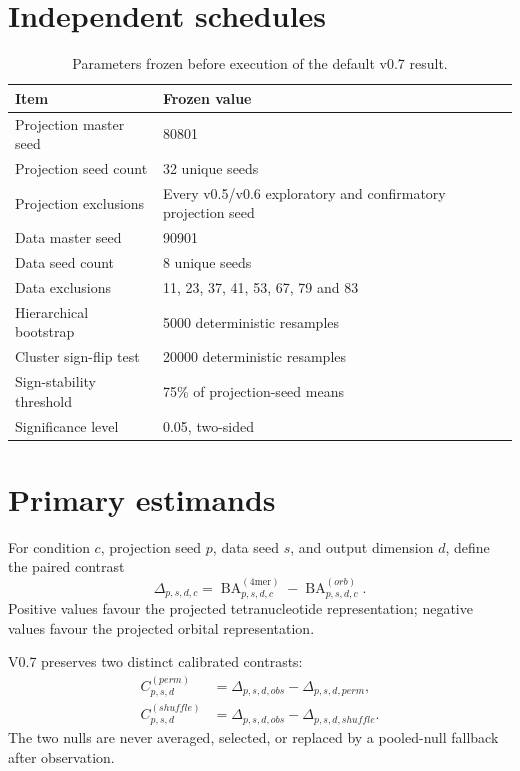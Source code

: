 \documentclass[11pt]{article}
\begin{document}
\section{Independent schedules}
\begin{table}[htbp]
\centering
\begin{tabular}{>{\raggedright\arraybackslash}p{}p{}}
\toprule
Item & Frozen value \\
\midrule
Projection master seed & 80801 \\
Projection seed count & 32 unique seeds \\
Projection exclusions & Every v0.5/v0.6 exploratory and confirmatory projection seed \\
Data master seed & 90901 \\
Data seed count & 8 unique seeds \\
Data exclusions & 11, 23, 37, 41, 53, 67, 79 and 83 \\
Hierarchical bootstrap & 5000 deterministic resamples \\
Cluster sign-flip test & 20000 deterministic resamples \\
Sign-stability threshold & 75\% of projection-seed means \\
Significance level & 0.05, two-sided \\
\bottomrule
\end{tabular}
\caption{Parameters frozen before execution of the default v0.7 result.}
\label{tab:frozen}
\end{table}

\section{Primary estimands}
For condition $c$, projection seed $p$, data seed $s$, and output dimension $d$, define the paired contrast
\begin{equation}
  \Delta_{p,s,d,c}
  = \operatorname{BA}^{(4\mathrm{mer})}_{p,s,d,c}
  - \operatorname{BA}^{(orb)}_{p,s,d,c}.
  \label{eq:delta}
\end{equation}
Positive values favour the projected tetranucleotide representation; negative values favour the projected orbital representation.

V0.7 preserves two distinct calibrated contrasts:
\begin{align}
  C^{(perm)}_{p,s,d}
    &= \Delta_{p,s,d,obs} - \Delta_{p,s,d,perm},
    \label{eq:perm} \\
  C^{(shuffle)}_{p,s,d}
    &= \Delta_{p,s,d,obs} - \Delta_{p,s,d,shuffle}.
    \label{eq:shuffle}
\end{align}
The two nulls are never averaged, selected, or replaced by a pooled-null fallback after observation.
\end{document}
